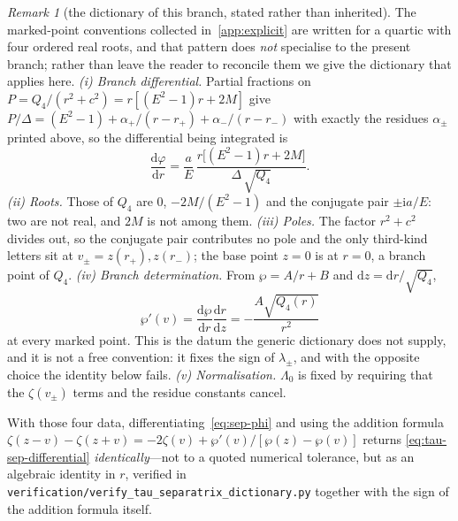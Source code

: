 \documentclass[12pt]{iopart}
\theoremstyle{plain}
\theoremstyle{definition}
\theoremstyle{remark}
\newtheorem{remark}[proposition]{Remark}
\newcommand{\rp}{r_{+}}
\newcommand{\dd}{\mathrm{d}}
\begin{document}
\begin{remark}[the dictionary of this branch, stated rather than inherited]
\label{rmk:tau-dictionary}
The marked-point conventions collected in~\ref{app:explicit} are written for a
quartic with four ordered real roots, and that pattern does \emph{not} specialise
to the present branch; rather than leave the reader to reconcile them we give the
dictionary that applies here. \emph{(i) Branch differential.} Partial fractions
on $P=Q_4/(r^2+c^2)=r[(E^2-1)r+2M]$ give
$P/\Delta=(E^2-1)+\alpha_+/(r-\rp)+\alpha_-/(r-r_-)$ with exactly the residues
$\alpha_\pm$ printed above, so the differential being integrated is
\begin{equation}
    \frac{\dd\varphi}{\dd r}
      =\frac{a}{E}\,\frac{r\big[(E^2-1)r+2M\big]}{\Delta\,\sqrt{Q_4}} .
    \label{eq:tau-sep-differential}
\end{equation}
\emph{(ii) Roots.} Those of $Q_4$ are $0$, $-2M/(E^2-1)$ and the conjugate pair
$\pm\mathrm ia/E$: two are not real, and $2M$ is not among them. \emph{(iii)
Poles.} The factor $r^2+c^2$ divides out, so the conjugate pair contributes no
pole and the only third-kind letters sit at $v_\pm=z(\rp),z(r_-)$; the base point
$z=0$ is at $r=0$, a branch point of $Q_4$. \emph{(iv) Branch determination.}
From $\wp=A/r+B$ and $\dd z=\dd r/\sqrt{Q_4}$,
\[
    \wp'(v)=\frac{\dd\wp}{\dd r}\frac{\dd r}{\dd z}
      =-\frac{A\sqrt{Q_4(r)}}{r^{2}}
\]
at every marked point. This is the datum the generic dictionary does not supply,
and it is not a free convention: it fixes the sign of $\lambda_\pm$, and with the
opposite choice the identity below fails.
\emph{(v) Normalisation.} $\Lambda_0$ is fixed by requiring that the $\zeta(v_\pm)$
terms and the residue constants cancel.

With those four data, differentiating~\eqref{eq:sep-phi} and using the addition
formula $\zeta(z-v)-\zeta(z+v)=-2\zeta(v)+\wp'(v)/[\wp(z)-\wp(v)]$ returns
\eqref{eq:tau-sep-differential} \emph{identically}---not to a quoted numerical
tolerance, but as an algebraic identity in $r$, verified in
\texttt{verification/verify\_tau\_separatrix\_dictionary.py} together with the
sign of the addition formula itself.
\end{remark}
\end{document}
